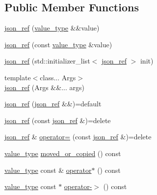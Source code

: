 \subsection*{Public Member Functions}
\begin{DoxyCompactItemize}
\item 
\hyperlink{classnlohmann_1_1detail_1_1json__ref_ae1adf5bcee8b6fa0c358710604fb1938}{json\+\_\+ref} (\hyperlink{classnlohmann_1_1detail_1_1json__ref_a78d76cf288141049568c0d670ed670ef}{value\+\_\+type} \&\&value)
\item 
\hyperlink{classnlohmann_1_1detail_1_1json__ref_a8c3eb3c6e952ed0cd7eece586ab4047c}{json\+\_\+ref} (const \hyperlink{classnlohmann_1_1detail_1_1json__ref_a78d76cf288141049568c0d670ed670ef}{value\+\_\+type} \&value)
\item 
\hyperlink{classnlohmann_1_1detail_1_1json__ref_adfba2db547283a7c6a5df9a32e72efc5}{json\+\_\+ref} (std\+::initializer\+\_\+list$<$ \hyperlink{classnlohmann_1_1detail_1_1json__ref}{json\+\_\+ref} $>$ init)
\item 
{\footnotesize template$<$class... Args$>$ }\\\hyperlink{classnlohmann_1_1detail_1_1json__ref_abe3ef8c2f07430bd5699bbd552f9e9c3}{json\+\_\+ref} (Args \&\&... args)
\item 
\hyperlink{classnlohmann_1_1detail_1_1json__ref_a59221ddbd756ca24d289c787fab38dbc}{json\+\_\+ref} (\hyperlink{classnlohmann_1_1detail_1_1json__ref}{json\+\_\+ref} \&\&)=default
\item 
\hyperlink{classnlohmann_1_1detail_1_1json__ref_a4c68db46934e03588bbd73b00147c0dd}{json\+\_\+ref} (const \hyperlink{classnlohmann_1_1detail_1_1json__ref}{json\+\_\+ref} \&)=delete
\item 
\hyperlink{classnlohmann_1_1detail_1_1json__ref}{json\+\_\+ref} \& \hyperlink{classnlohmann_1_1detail_1_1json__ref_a98956ba676b1ae16b62346f9c4fb752e}{operator=} (const \hyperlink{classnlohmann_1_1detail_1_1json__ref}{json\+\_\+ref} \&)=delete
\item 
\hyperlink{classnlohmann_1_1detail_1_1json__ref_a78d76cf288141049568c0d670ed670ef}{value\+\_\+type} \hyperlink{classnlohmann_1_1detail_1_1json__ref_ae39e523218bf05cac3fb5b5b1cd5efb6}{moved\+\_\+or\+\_\+copied} () const
\item 
\hyperlink{classnlohmann_1_1detail_1_1json__ref_a78d76cf288141049568c0d670ed670ef}{value\+\_\+type} const  \& \hyperlink{classnlohmann_1_1detail_1_1json__ref_aa3100e41472dba02ab78ccc1607e44ab}{operator$\ast$} () const
\item 
\hyperlink{classnlohmann_1_1detail_1_1json__ref_a78d76cf288141049568c0d670ed670ef}{value\+\_\+type} const  $\ast$ \hyperlink{classnlohmann_1_1detail_1_1json__ref_adb652774a67829876449dc0b30637456}{operator-\/$>$} () const
\end{DoxyCompactItemize}
